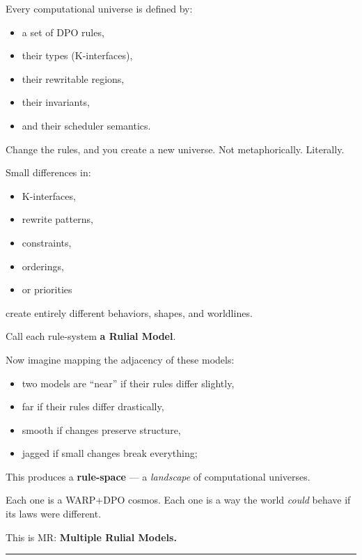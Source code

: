 Every computational universe is defined by:

\begin{itemize}
\tightlist
\item
  a set of DPO rules,\\
\item
  their types (K-interfaces),
\item
  their rewritable regions,
\item
  their invariants,
\item
  and their scheduler semantics.
\end{itemize}

Change the rules, and you create a new universe. Not metaphorically.
Literally.

Small differences in:

\begin{itemize}
\tightlist
\item
  K-interfaces,\\
\item
  rewrite patterns,
\item
  constraints,
\item
  orderings,
\item
  or priorities
\end{itemize}

create entirely different behaviors, shapes, and worldlines.

Call each rule-system \textbf{a Rulial Model}.

Now imagine mapping the adjacency of these models:

\begin{itemize}
\tightlist
\item
  two models are ``near'' if their rules differ slightly,
\item
  far if their rules differ drastically,
\item
  smooth if changes preserve structure,\\
\item
  jagged if small changes break everything;
\end{itemize}

This produces a \textbf{rule-space} --- a \emph{landscape} of
computational universes.

Each one is a WARP+DPO cosmos. Each one is a way the world \emph{could}
behave if its laws were different.

This is MR: \textbf{Multiple Rulial Models.}

\begin{center}\rule{0.5\linewidth}{0.5pt}\end{center}

